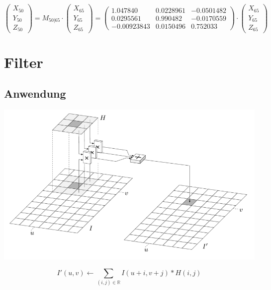 \documentclass[10pt]{article}
\newcommand{\RN}{\mathbb{R}} %
\begin{document}
\begin{equation*}
	\begin{pmatrix} X_{50} \\ Y_{50} \\ Z_{50} \end{pmatrix} = 
	M_{50|65} \cdot \begin{pmatrix} X_{65} \\ Y_{65} \\ Z_{65} \end{pmatrix} =
	 \begin{pmatrix} 
	1.047840 & 0.0228961 & -0.0501482\\ 
	0.0295561 & 0.990482 & -0.0170559 \\
	 -0.00923843 & 0.0150496 & 0.752033
	 \end{pmatrix} \cdot \begin{pmatrix} X_{65} \\ Y_{65} \\ Z_{65} \end{pmatrix} 
\end{equation*}

\pagebreak
\section{Filter}

\subsection{Anwendung}
\begin{center}
	\includegraphics[scale=0.3]{filter-anwendung.png}
\end{center}
\begin{equation*}
	I'(u,v) \leftarrow \sum_{(i,j)\in \RN} I(u+ i, v+j) * H(i,j)
\end{equation*}
\end{document}
